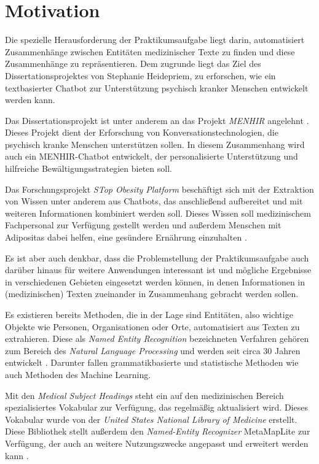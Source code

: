 \chapter{Motivation}

Die spezielle Herausforderung der Praktikumsaufgabe liegt darin, automatisiert Zusammenhänge zwischen Entitäten medizinischer Texte zu finden und diese Zusammenhänge zu repräsentieren. Dem zugrunde liegt das Ziel des Dissertationsprojektes von Stephanie Heidepriem, zu erforschen, wie ein textbasierter Chatbot zur Unterstützung 
psychisch kranker Menschen entwickelt werden kann. 

Das Dissertationsprojekt  ist unter anderem an das Projekt \emph{MENHIR} angelehnt \cite{menhir}. Dieses Projekt dient der Erforschung von Konversationstechnologien, die psychisch kranke Menschen unterstützen sollen. In diesem Zusammenhang wird auch 
ein MENHIR-Chatbot entwickelt, der personalisierte Unterstützung und hilfreiche Bewältigungsstrategien bieten soll. 

Das Forschungsprojekt \emph{STop Obesity Platform} beschäftigt sich mit der Extraktion von Wissen unter anderem aus Chatbots, das anschließend aufbereitet und mit weiteren Informationen kombiniert werden soll. Dieses Wissen soll medizinischem Fachpersonal zur Verfügung gestellt werden und außerdem Menschen mit Adipositas dabei helfen, eine gesündere Ernährung einzuhalten \cite{stopobesity}.


Es ist aber auch denkbar, dass die Problemstellung der Praktikumsaufgabe auch darüber hinaus für weitere Anwendungen interessant ist und mögliche Ergebnisse in verschiedenen Gebieten eingesetzt werden können, in denen Informationen in (medizinischen) Texten zueinander in Zusammenhang gebracht werden sollen.

Es existieren bereits Methoden, die in der Lage sind Entitäten, also wichtige Objekte wie Personen, Organisationen oder Orte, automatisiert aus Texten zu extrahieren. Diese als \emph{Named Entity Recognition} bezeichneten Verfahren gehören zum Bereich des \emph{Natural Language Processing} und werden seit circa 30 Jahren entwickelt \cite{trends_in_ner}. Darunter fallen grammatikbasierte und statistische Methoden wie auch Methoden des Machine Learning.

Mit den \emph{Medical Subject Headings} \cite{mesh} steht ein auf den medizinischen Bereich spezialisiertes Vokabular zur Verfügung, das regelmäßig aktualisiert wird. Dieses Vokabular wurde von der \emph{United States National Library of Medicine} erstellt. Diese Bibliothek stellt außerdem den \emph{Named-Entity Recognizer}
\glqq MetaMapLite\grqq{} zur Verfügung, der auch an weitere Nutzungszwecke angepasst und erweitert werden kann \cite{metamaplite}. 

